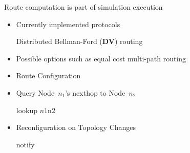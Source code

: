 \documentclass[landscape]{foils}
\begin{document}
\begin{comment}
\item Algorithm used: Dijkstra's all-pairs spf algorithm
\end{comment}

Route computation is part of simulation execution
\begin{itemize}
\item Currently implemented protocols

  Distributed Bellman-Ford (\textbf{DV}) routing
\item Possible options such as equal cost multi-path routing
\end{itemize}

\begin{comment}
\item aggressive routing strategy
\end{comment}


\begin{comment}
\item \verb|\placefig{rtarch}|
\item RouteLogic global class for routing, all classes need it thgouh
\item Only detail routing needs rtObject and associated strategies
\end{comment}

\begin{itemize}
\item Route Configuration


\item Query Node~$n_1$'s nexthop to Node~$n_2$
  \begin{program}
     lookup $n1 $n2
  \end{program}

\item Reconfiguration on Topology Changes
  \begin{program}
     notify
  \end{program}
\end{itemize}
\end{document}
